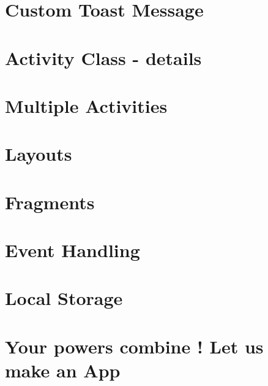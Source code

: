 \documentclass[11pt]{beamer}
\begin{document}
\section{Custom Toast Message}

\section{Activity Class - details}

\section{Multiple Activities}

\section{Layouts}






\section{Fragments}
%

\section{Event Handling}
%

\section{Local Storage}
%


\section{Your powers combine ! Let us make an App}
\end{document}
